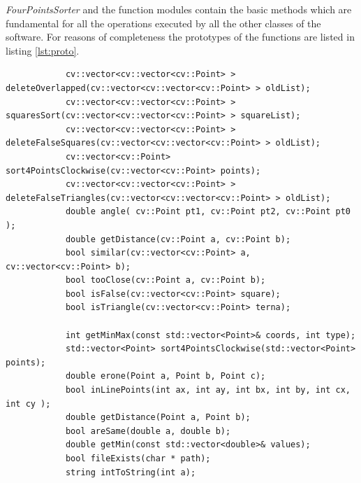 		\emph{FourPointsSorter} and the function modules contain the basic methods which are fundamental for all the operations executed by all the other classes of the software.
		For reasons of completeness the prototypes of the functions are listed in listing \ref{lst:proto}.

			\begin{lstlisting}
			cv::vector<cv::vector<cv::Point> > deleteOverlapped(cv::vector<cv::vector<cv::Point> > oldList);
			cv::vector<cv::vector<cv::Point> > squaresSort(cv::vector<cv::vector<cv::Point> > squareList);
			cv::vector<cv::vector<cv::Point> > deleteFalseSquares(cv::vector<cv::vector<cv::Point> > oldList);
			cv::vector<cv::Point> sort4PointsClockwise(cv::vector<cv::Point> points);
			cv::vector<cv::vector<cv::Point> > deleteFalseTriangles(cv::vector<cv::vector<cv::Point> > oldList);
			double angle( cv::Point pt1, cv::Point pt2, cv::Point pt0 );
			double getDistance(cv::Point a, cv::Point b);
			bool similar(cv::vector<cv::Point> a, cv::vector<cv::Point> b);
			bool tooClose(cv::Point a, cv::Point b);
			bool isFalse(cv::vector<cv::Point> square);
			bool isTriangle(cv::vector<cv::Point> terna);	
			
			int getMinMax(const std::vector<Point>& coords, int type);
			std::vector<Point> sort4PointsClockwise(std::vector<Point> points);
			double erone(Point a, Point b, Point c);
			bool inLinePoints(int ax, int ay, int bx, int by, int cx, int cy );
			double getDistance(Point a, Point b);
			bool areSame(double a, double b);
			double getMin(const std::vector<double>& values);
			bool fileExists(char * path);
			string intToString(int a);\end{lstlisting}
		
			
